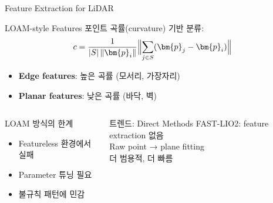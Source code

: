 \begin{frame}{Feature Extraction for LiDAR}
  \begin{block}{LOAM-style Features}
    포인트 곡률(curvature) 기반 분류:
    \begin{align*}
      c = \frac{1}{|S|\,\|\bm{p}_i\|}
      \Bigl\|\sum_{j \in S}(\bm{p}_j - \bm{p}_i)\Bigr\|
    \end{align*}
    \begin{itemize}
      \item \textbf{Edge features}: 높은 곡률 (모서리, 가장자리)
      \item \textbf{Planar features}: 낮은 곡률 (바닥, 벽)
    \end{itemize}
  \end{block}
  \pause
  \begin{columns}
    \begin{alertblock}{LOAM 방식의 한계}
      \begin{itemize}
        \item Featureless 환경에서 실패
        \item Parameter 튜닝 필요
        \item 불규칙 패턴에 민감
      \end{itemize}
    \end{alertblock}
    \begin{exampleblock}{트렌드: Direct Methods}
      FAST-LIO2: feature extraction 없음\\
      Raw point → plane fitting\\
      더 범용적, 더 빠름
    \end{exampleblock}
  \end{columns}
\end{frame}

